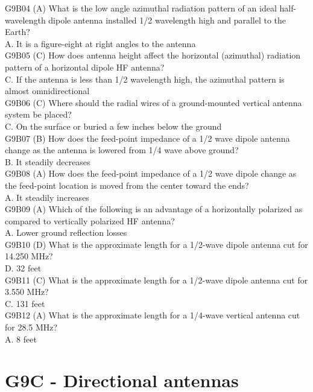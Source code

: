 \documentclass[12pt,letterpaper]{report}
\begin{document}
G9B04 (A) What is the low angle azimuthal radiation pattern of an ideal half-wavelength dipole antenna installed 1/2 wavelength high and parallel to the Earth?\\
A. It is a figure-eight at right angles to the antenna\\

G9B05 (C) How does antenna height affect the horizontal (azimuthal) radiation pattern of a horizontal dipole HF antenna?\\
C. If the antenna is less than 1/2 wavelength high, the azimuthal pattern is almost omnidirectional\\

G9B06 (C) Where should the radial wires of a ground-mounted vertical antenna system be placed?\\
C. On the surface or buried a few inches below the ground\\

G9B07 (B) How does the feed-point impedance of a 1/2 wave dipole antenna change as the antenna is lowered from 1/4 wave above ground?\\
B. It steadily decreases\\

G9B08 (A) How does the feed-point impedance of a 1/2 wave dipole change as the feed-point location is moved from the center toward the ends?\\
A. It steadily increases\\

G9B09 (A) Which of the following is an advantage of a horizontally polarized as compared to vertically polarized HF antenna?\\
A. Lower ground reflection losses \\

G9B10 (D) What is the approximate length for a 1/2-wave dipole antenna cut for 14.250 MHz?\\
D. 32 feet\\

G9B11 (C) What is the approximate length for a 1/2-wave dipole antenna cut for 3.550 MHz?\\
C. 131 feet\\

G9B12 (A) What is the approximate length for a 1/4-wave vertical antenna cut for 28.5 MHz?\\
A. 8 feet\\

\section{G9C - Directional antennas}
\end{document}
